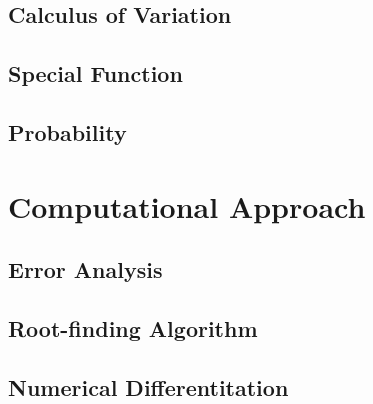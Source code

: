 \documentclass[10pt]{report}
\begin{document}
\section{Calculus of Variation}

\clearpage

\clearpage

\section{Special Function}

\clearpage

\section{Probability}

\clearpage

\chapter{Computational Approach}
\clearpage
\section{Error Analysis}


\section{Root-finding Algorithm}


\section{Numerical Differentitation}

\printbibliography
\end{document}
